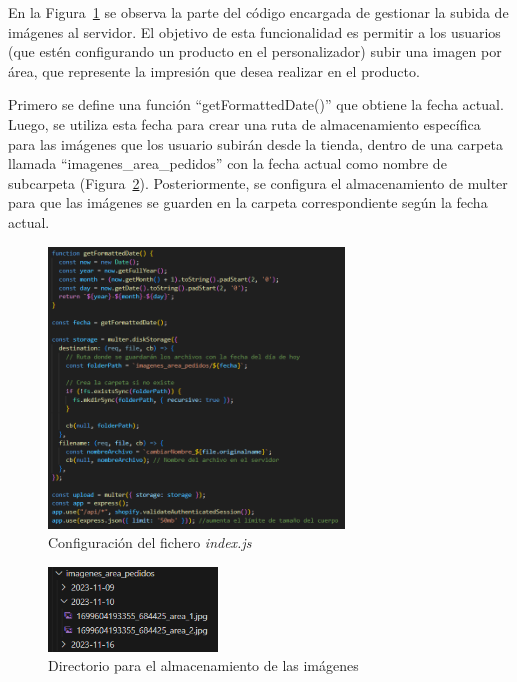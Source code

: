 \documentclass[11pt]{article}
\begin{document}
En la Figura~\ref{fig:configIndex} se observa la parte del código encargada de gestionar la subida de imágenes al servidor. El objetivo de esta 
funcionalidad es permitir a los usuarios (que estén configurando un producto en el personalizador) subir una imagen por área, que represente la impresión que desea
realizar en el producto. 

Primero se define una función ``getFormattedDate()'' que obtiene la fecha actual. Luego, se utiliza esta fecha para crear una ruta de almacenamiento específica para 
las imágenes que los usuario subirán desde la tienda, dentro de una carpeta llamada ``imagenes\_area\_pedidos'' con la fecha actual como nombre de subcarpeta (Figura~\ref{fig:carpetaImagenes}).
Posteriormente, se configura el almacenamiento de multer para que las imágenes se guarden en la carpeta correspondiente según la fecha actual.

\begin{figure}[H]
    \centering
    \includegraphics[width=0.7\textwidth]{imagenes-back/configuracionIndexjs.png}
    \caption{\label{fig:configIndex} Configuración del fichero \textit{index.js} }
    \vspace{\fill}
\end{figure}

\begin{figure}[H]
    \centering
    \includegraphics[width=0.4\textwidth]{imagenes-back/almacenamientoCarpetaImagenes.png}
    \caption{\label{fig:carpetaImagenes} Directorio para el almacenamiento de las imágenes }
    \vspace{\fill}
\end{figure}
\end{document}
